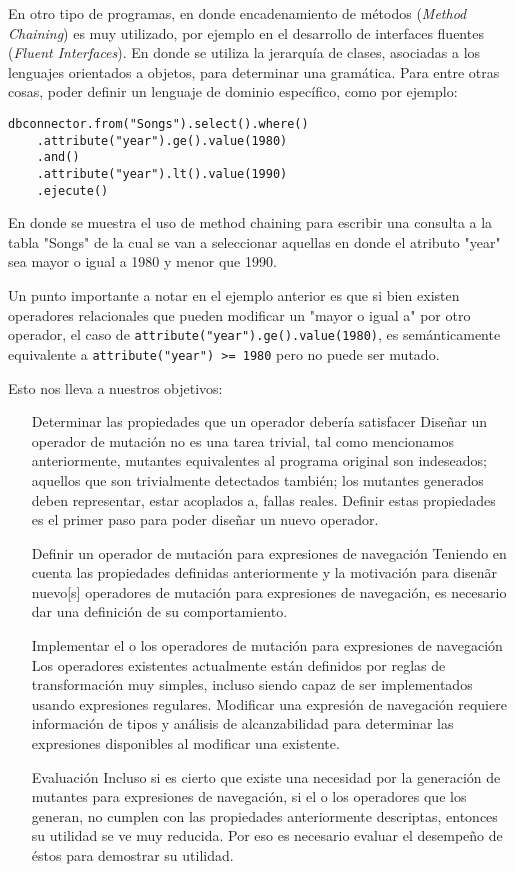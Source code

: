 En otro tipo de programas, en donde encadenamiento de m\'etodos (\emph{Method Chaining}) es muy utilizado, por ejemplo en el desarrollo de interfaces fluentes (\emph{Fluent Interfaces}). En donde se utiliza la jerarqu\'ia de clases, asociadas a los lenguajes orientados a objetos, para determinar una gram\'atica. Para entre otras cosas, poder definir un lenguaje de dominio espec\'ifico, como por ejemplo:
\begin{center}
	\begin{lstlisting}[mathescape=true]
	dbconnector.from("Songs").select().where()
	.attribute("year").ge().value(1980)
	.and()
	.attribute("year").lt().value(1990)
	.ejecute()
	\end{lstlisting}
\end{center}
En donde se muestra el uso de method chaining para escribir una consulta a la tabla "Songs" de la cual se van a seleccionar aquellas en donde el atributo "year" sea mayor o igual a 1980 y menor que 1990.

Un punto importante a notar en el ejemplo anterior es que si bien existen operadores relacionales que pueden modificar un "mayor o igual a" por otro operador, el caso de \texttt{attribute("year").ge().value(1980)}, es sem\'anticamente equivalente a \texttt{attribute("year") >= 1980} pero no puede ser mutado.

Esto nos lleva a nuestros objetivos:

\begin{enumerate}[leftmargin=.75cm,align=left]
	\item[Determinar las propiedades que un operador deber\'ia satisfacer]
	Dise\~nar un operador de mutaci\'on no es una tarea trivial, tal como mencionamos anteriormente, mutantes equivalentes al programa original son indeseados; aquellos que son trivialmente detectados tambi\'en; los mutantes generados deben representar, estar acoplados a, fallas reales. Definir estas propiedades es el primer paso para poder dise\~nar un nuevo operador.
	\item[Definir un operador de mutaci\'on para expresiones de navegaci\'on]
	Teniendo en cuenta las propiedades definidas anteriormente y la motivaci\'on para disen\~ar nuevo[s] operadores de mutaci\'on para expresiones de navegaci\'on, es necesario dar una definici\'on de su comportamiento.
	\item[Implementar el o los operadores de mutaci\'on para expresiones de navegaci\'on] 
	Los operadores existentes actualmente est\'an definidos por reglas de transformaci\'on muy simples, incluso siendo capaz de ser implementados usando expresiones regulares. Modificar una expresi\'on de navegaci\'on requiere informaci\'on de tipos y an\'alisis de alcanzabilidad para determinar las expresiones disponibles al modificar una existente.
	\item[Evaluaci\'on]
	Incluso si es cierto que existe una necesidad por la generaci\'on de mutantes para expresiones de navegaci\'on, si el o los operadores que los generan, no cumplen con las propiedades anteriormente descriptas, entonces su utilidad se ve muy reducida. Por eso es necesario evaluar el desempe\~no de \'estos para demostrar su utilidad.
\end{enumerate}

